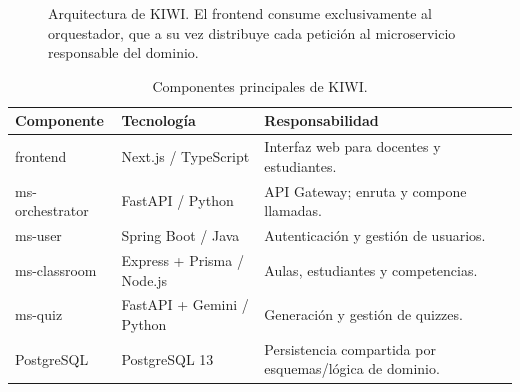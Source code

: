 \documentclass[12pt,a4paper]{article}
\begin{document}
\begin{figure}[htbp]
  \centering
  \caption{Arquitectura de KIWI. El frontend consume exclusivamente al orquestador, que a su vez
  distribuye cada petición al microservicio responsable del dominio.}
  \label{fig:arquitectura}
\end{figure}

\begin{table}[H]
\centering
\begin{tabular}{p{3.4cm}p{4cm}p{6cm}}
\toprule
\textbf{Componente} & \textbf{Tecnología} & \textbf{Responsabilidad}\\
\midrule
frontend & Next.js / TypeScript & Interfaz web para docentes y estudiantes.\\
ms-orchestrator & FastAPI / Python & API Gateway; enruta y compone llamadas.\\
ms-user & Spring Boot / Java & Autenticación y gestión de usuarios.\\
ms-classroom & Express + Prisma / Node.js & Aulas, estudiantes y competencias.\\
ms-quiz & FastAPI + Gemini / Python & Generación y gestión de quizzes.\\
PostgreSQL & PostgreSQL 13 & Persistencia compartida por esquemas/lógica de dominio.\\
\bottomrule
\end{tabular}
\caption{Componentes principales de KIWI.}
\end{table}
\end{document}
